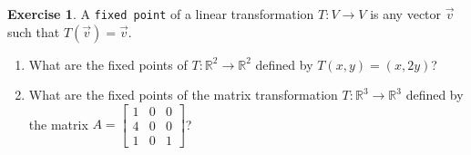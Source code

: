 \documentclass{beamer}
\newcommand{\R}{\mathbb{R}}
\newcommand{\fn}{\insertframenumber}
\theoremstyle{definition}
\newtheorem{exercise}{Exercise}
\renewcommand{\emph}[1]{{\color{blue}\texttt{#1}}}
\begin{document}
\begin{frame}{\fn}
	\begin{exercise}
		A \emph{fixed point} of a linear transformation $T:V\to V$ is any vector $\vec v$ such that $T(\vec v)=\vec v$.
		\begin{enumerate}[label=(\alph*)]
			\item What are the fixed points of $T:\R^2\to\R^2$ defined by $T(x,y)=(x,2y)$?
			\item What are the fixed points of the matrix transformation $T:\R^3\to \R^3$ defined by the matrix $A=\begin{bmatrix}
			1 & 0 & 0 \\
			4 & 0 & 0 \\
			1 & 0 & 1
			\end{bmatrix}$?
		\end{enumerate}
	\end{exercise}
\end{frame}
\end{document}
